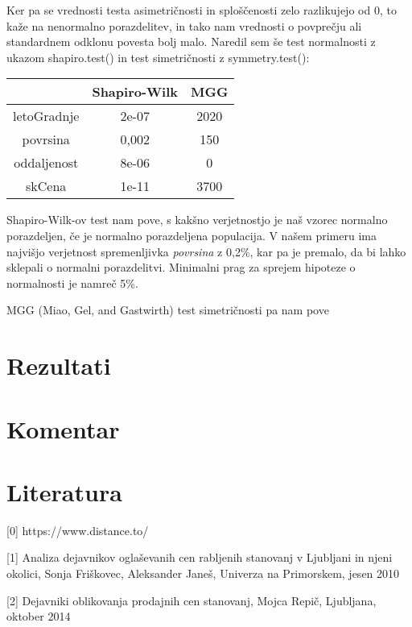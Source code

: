 \documentclass[a4paper, 12pt]{article}
\begin{document}
Ker pa se vrednosti testa asimetričnosti in sploščenosti zelo razlikujejo
od $ 0 $, to kaže na nenormalno porazdelitev, in tako nam vrednosti o povprečju
ali standardnem odklonu povesta bolj malo. Naredil sem še test normalnosti z
ukazom {\sf shapiro.test()} in test simetričnosti z {\sf symmetry.test()}:

\begin{center}
\begin{tabular}{ c|c|c }
	& Shapiro-Wilk & MGG \\
	\hline
	letoGradnje & 2e-07 & 2020 \\
	povrsina & 0,002 & 150 \\
	oddaljenost & 8e-06 & 0 \\
	skCena & 1e-11 & 3700 \\
\end{tabular}
\end{center}

Shapiro-Wilk-ov test nam pove, s kakšno verjetnostjo je naš vzorec normalno
porazdeljen, če je normalno porazdeljena populacija. V našem primeru ima
najvišjo verjetnost spremenljivka \textit{povrsina} z 0,2\%, kar pa je premalo,
da bi lahko sklepali o normalni porazdelitvi. Minimalni prag za sprejem
hipoteze o normalnosti je namreč 5\%.

MGG (Miao, Gel, and Gastwirth) test simetričnosti pa nam pove


\section{Rezultati}

\section{Komentar}

\section{Literatura}

[0]
https://www.distance.to/

[1] Analiza dejavnikov oglaševanih cen rabljenih stanovanj v Ljubljani in njeni
okolici, Sonja Friškovec, Aleksander Janeš, Univerza na Primorskem, jesen 2010

[2] Dejavniki oblikovanja prodajnih cen stanovanj, Mojca Repič, Ljubljana,
oktober 2014
\end{document}
